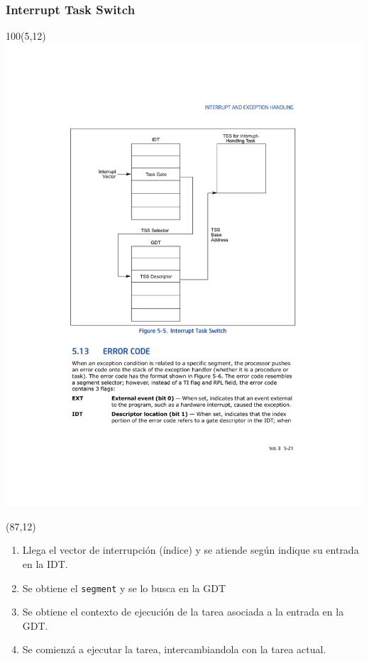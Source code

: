 \documentclass[aspectratio=169]{beamer}
\begin{document}
\begin{frame}
    \frametitle{Interrupt Task Switch}
    \begin{textblock}{100}(5,12)
            \includegraphics[scale=0.60]{img/interrupt_task} 
    \end{textblock}
    \begin{textblock}{70}(87,12)
        \begin{enumerate}
        \small
        \setlength\itemsep{0.4cm}
        \item<2->[-] Llega el vector de interrupción (índice) y se atiende según indique su entrada en la IDT.
        \item<3->[-] Se obtiene el \textcolor{verdeuca}{\texttt{segment}} y se lo busca en la GDT
        \item<4->[-] Se obtiene el contexto de ejecución de la tarea asociada a la entrada en la GDT.
        \item<5->[-] Se comienzá a ejecutar la tarea, intercambiandola con la tarea actual.
        \end{enumerate}
    \end{textblock}
\end{frame}
\end{document}
